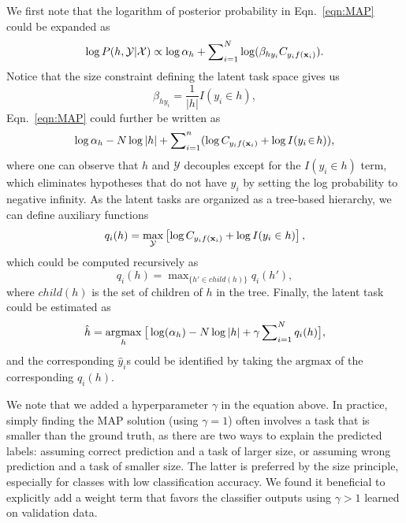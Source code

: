 We first note that the logarithm of posterior probability in Eqn.\ \ref{eqn:MAP} could be expanded as
\begin{equation}
\log P(h, \mathcal{Y} | \mathcal{X}) \propto \log\alpha_h + \sum\nolimits_{i=1}^{N}\log(\beta_{hy_i}C_{y_if(\mathbf{x}_i)}).
\end{equation}
Notice that the size constraint defining the latent task space gives us
\begin{equation}
    \beta_{hy_i} = \frac{1}{|h|}I(y_i \in h),
\end{equation}
Eqn.\ \ref{eqn:MAP} could further be written as
\begin{equation*}
    \log\alpha_h - N \log|h| + \sum\nolimits_{i=1}^{n} (\log C_{y_if(\mathbf{x}_i)} + \log I(y_i\!\in\!h)),
\end{equation*}
where one can observe that $h$ and $\mathcal{Y}$ decouples except for the $I(y_i\in h)$ term, which eliminates hypotheses that do not have $y_i$ by setting the log probability to negative infinity. As the latent tasks are organized as a tree-based hierarchy, we can define auxiliary functions
\begin{equation}
q_i(h) = \max_{\mathcal{Y}} \left[\log C_{y_if(\mathbf{x}_i)} + \log I(y_i\in h)\right],
\end{equation}
which could be computed recursively as
\begin{equation}
q_i(h) = \max\nolimits_{\{h' \in child(h)\}} q_i(h'),
\end{equation}
where $child(h)$ is the set of children of $h$ in the tree. Finally, the latent task could be estimated as
\begin{equation}\label{eqn:taskargmax}
    \hat{h} = \underset{h}{\mathrm{argmax}} \: \big[\log(\alpha_h) - N\log|h| + \gamma\sum\nolimits_{i=1}^{N} q_i(h)\big],
\end{equation}
and the corresponding $\hat{y}_i$s could be identified by taking the $\mathrm{argmax}$ of the corresponding $q_i(h)$.

We note that we added a hyperparameter $\gamma$ in the equation above. In practice, simply finding the MAP solution (using $\gamma=1$) often involves a task that is smaller than the ground truth, as there are two ways to explain the predicted labels: assuming correct prediction and a task of larger size, or assuming wrong prediction and a task of smaller size. The latter is preferred by the size principle, especially for classes with low classification accuracy. We found it beneficial to explicitly add a weight term that favors the classifier outputs using $\gamma>1$ learned on validation data.

